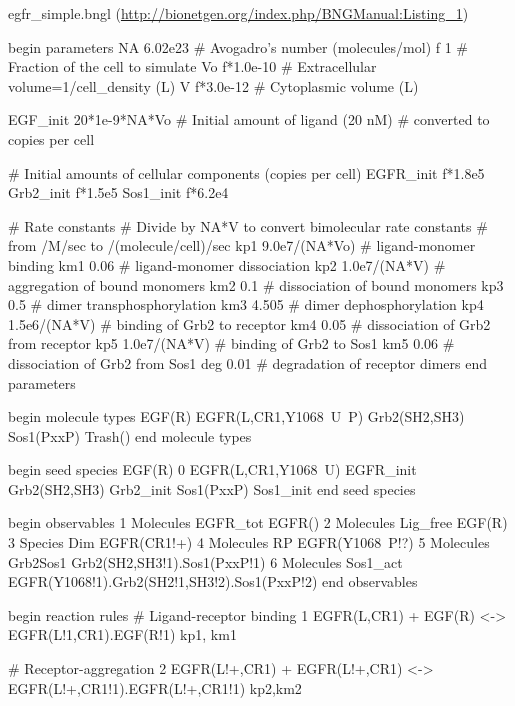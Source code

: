 egfr\_simple.bngl (\url{http://bionetgen.org/index.php/BNGManual:Listing_1}) 

\begin{example}[style=latex]
begin parameters
  NA 6.02e23                # Avogadro's number (molecules/mol)
  f  1                      # Fraction of the cell to simulate
  Vo f*1.0e-10              # Extracellular volume=1/cell_density (L)
  V  f*3.0e-12              # Cytoplasmic volume (L)
  
  EGF_init 20*1e-9*NA*Vo    # Initial amount of ligand (20 nM)
                            # converted to copies per cell
                            
  # Initial amounts of cellular components (copies per cell)
  EGFR_init f*1.8e5
  Grb2_init f*1.5e5
  Sos1_init f*6.2e4

  # Rate constants
  # Divide by NA*V to convert bimolecular rate constants
  # from /M/sec to /(molecule/cell)/sec
  kp1 9.0e7/(NA*Vo)   # ligand-monomer binding
  km1 0.06            # ligand-monomer dissociation
  kp2 1.0e7/(NA*V)    # aggregation of bound monomers
  km2 0.1             # dissociation of bound monomers
  kp3 0.5             # dimer transphosphorylation
  km3 4.505           # dimer dephosphorylation
  kp4 1.5e6/(NA*V)    # binding of Grb2 to receptor
  km4 0.05            # dissociation of Grb2 from receptor
  kp5 1.0e7/(NA*V)    # binding of Grb2 to Sos1
  km5 0.06            # dissociation of Grb2 from Sos1
  deg 0.01            # degradation of receptor dimers
end parameters

begin molecule types
  EGF(R)
  EGFR(L,CR1,Y1068~U~P)
  Grb2(SH2,SH3)
  Sos1(PxxP)
  Trash()
end molecule types

begin seed species
  EGF(R)              0
  EGFR(L,CR1,Y1068~U) EGFR_init
  Grb2(SH2,SH3)       Grb2_init
  Sos1(PxxP)          Sos1_init
end seed species

begin observables
  1 Molecules   EGFR_tot  EGFR()
  2 Molecules   Lig_free  EGF(R)
  3 Species     Dim       EGFR(CR1!+)
  4 Molecules   RP        EGFR(Y1068~P!?)
  5 Molecules   Grb2Sos1  Grb2(SH2,SH3!1).Sos1(PxxP!1)
  6 Molecules   Sos1_act  EGFR(Y1068!1).Grb2(SH2!1,SH3!2).Sos1(PxxP!2)
end observables

begin reaction rules
  # Ligand-receptor binding
  1 EGFR(L,CR1) + EGF(R) <-> EGFR(L!1,CR1).EGF(R!1) kp1, km1
  
  # Receptor-aggregation
  2 EGFR(L!+,CR1) + EGFR(L!+,CR1) <-> EGFR(L!+,CR1!1).EGFR(L!+,CR1!1) kp2,km2
  

\end{example}
